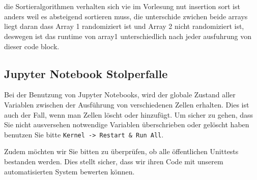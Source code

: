 \documentclass[11pt]{article}
\begin{document}
    \begin{center}
    \end{center}
    { \hspace*{\fill} \\}
    
    \begin{center}
    \end{center}
    { \hspace*{\fill} \\}
    
    die Sortieralgorithmen verhalten sich vie im Vorlesung nut insertion
sort ist anders weil es absteigend sortieren muss, die unterschide
zwichen beide arrays liegt daran dass Array 1 randomiziert ist und Array
2 nicht randomiziert ist, deswegen ist das runtime von array1
unterschiedlich nach jeder ausfuhrung von dieser code block.

    \hypertarget{jupyter-notebook-stolperfalle}{%
\subsection{Jupyter Notebook
Stolperfalle}\label{jupyter-notebook-stolperfalle}}

Bei der Benutzung von Jupyter Notebooks, wird der globale Zustand aller
Variablen zwischen der Ausführung von verschiedenen Zellen erhalten.
Dies ist auch der Fall, wenn man Zellen löscht oder hinzufügt. Um sicher
zu gehen, dass Sie nicht ausversehen notwendige Variablen überschrieben
oder gelöscht haben benutzen Sie bitte
\texttt{Kernel\ -\textgreater{}\ Restart\ \&\ Run\ All}.

Zudem möchten wir Sie bitten zu überprüfen, ob alle öffentlichen
Unittests bestanden werden. Dies stellt sicher, dass wir ihren Code mit
unserem automatisierten System bewerten können.


    
    
    
\end{document}
